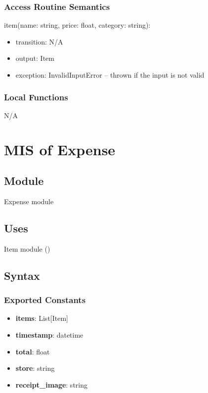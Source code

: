 \documentclass[12pt, titlepage]{article}
\begin{document}
\subsubsection{Access Routine Semantics}

\noindent item(name: string, price: float, category: string):
\begin{itemize}
\item transition: N/A
\item output: Item
\item exception: InvalidInputError -- thrown if the input is not valid
\end{itemize}

\subsubsection{Local Functions}
N/A

\newpage

\section{MIS of Expense}\label{expense_module}

\subsection{Module}

Expense module

\subsection{Uses}
Item module ()

\subsection{Syntax}

\subsubsection{Exported Constants}
\begin{itemize}
  \item \textbf{items}: List[Item]
  \item \textbf{timestamp}: datetime
  \item \textbf{total}: float
  \item \textbf{store}: string
  \item \textbf{receipt\_image}: string
\end{itemize}
\end{document}
